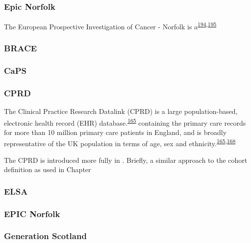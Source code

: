 \documentclass[a4paper, twoside]{templates/ociamthesis}
\begin{document}
~

\hypertarget{epic-norfolk}{%
\subsubsection{Epic Norfolk}\label{epic-norfolk}}

The European Prospective Investigation of Cancer - Norfolk is a\textsuperscript{\protect\hyperlink{ref-riboli1997}{194},\protect\hyperlink{ref-riboli2002}{195}}

\hypertarget{brace}{%
\subsubsection{BRACE}\label{brace}}

\hypertarget{caps}{%
\subsubsection{CaPS}\label{caps}}

\hypertarget{cprd}{%
\subsubsection{CPRD}\label{cprd}}

The Clinical Practice Research Datalink (CPRD) is a large population-based, electronic health record (EHR) database.\textsuperscript{\protect\hyperlink{ref-herrett2015}{165}} containing the primary care records for more than 10 million primary care patients in England, and is broadly representative of the UK population in terms of age, sex and ethnicity.\textsuperscript{\protect\hyperlink{ref-herrett2015}{165},\protect\hyperlink{ref-mathur2014}{168}}

The CPRD is introduced more fully in . Briefly, a similar approach to the cohort definition as used in Chapter

\hypertarget{elsa}{%
\subsubsection{ELSA}\label{elsa}}

\hypertarget{epic-norfolk-1}{%
\subsubsection{EPIC Norfolk}\label{epic-norfolk-1}}

\hypertarget{generation-scotland}{%
\subsubsection{Generation Scotland}\label{generation-scotland}}
\end{document}
